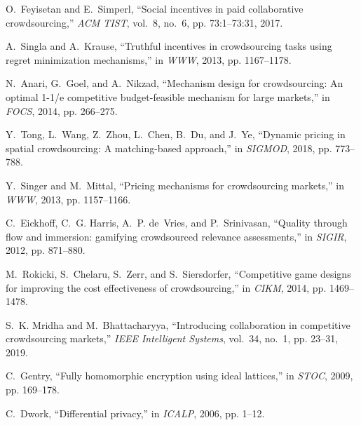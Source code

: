 \documentclass[11pt]{article}
\begin{document}
\begin{thebibliography}{10}
	O.~Feyisetan and E.~Simperl, ``Social incentives in paid collaborative
	crowdsourcing,'' \emph{{ACM} {TIST}}, vol.~8, no.~6, pp. 73:1--73:31, 2017.
	
	A.~Singla and A.~Krause, ``Truthful incentives in crowdsourcing tasks using
	regret minimization mechanisms,'' in \emph{{WWW}}, 2013, pp. 1167--1178.
	
	N.~Anari, G.~Goel, and A.~Nikzad, ``Mechanism design for crowdsourcing: An
	optimal 1-1/e competitive budget-feasible mechanism for large markets,'' in
	\emph{{FOCS}}, 2014, pp. 266--275.
	
	Y.~Tong, L.~Wang, Z.~Zhou, L.~Chen, B.~Du, and J.~Ye, ``Dynamic pricing in
	spatial crowdsourcing: {A} matching-based approach,'' in \emph{SIGMOD}, 2018,
	pp. 773--788.
	
	Y.~Singer and M.~Mittal, ``Pricing mechanisms for crowdsourcing markets,'' in
	\emph{{WWW}}, 2013, pp. 1157--1166.
	
	C.~Eickhoff, C.~G. Harris, A.~P. de~Vries, and P.~Srinivasan, ``Quality through
	flow and immersion: gamifying crowdsourced relevance assessments,'' in
	\emph{{SIGIR}}, 2012, pp. 871--880.
	
	M.~Rokicki, S.~Chelaru, S.~Zerr, and S.~Siersdorfer, ``Competitive game designs
	for improving the cost effectiveness of crowdsourcing,'' in \emph{{CIKM}},
	2014, pp. 1469--1478.
	
	S.~K. Mridha and M.~Bhattacharyya, ``Introducing collaboration in competitive
	crowdsourcing markets,'' \emph{{IEEE} Intelligent Systems}, vol.~34, no.~1,
	pp. 23--31, 2019.
	
	C.~Gentry, ``Fully homomorphic encryption using ideal lattices,'' in
	\emph{STOC}, 2009, pp. 169--178.
	
	C.~Dwork, ``Differential privacy,'' in \emph{ICALP}, 2006, pp. 1--12.
	
\end{thebibliography}
\end{document}
